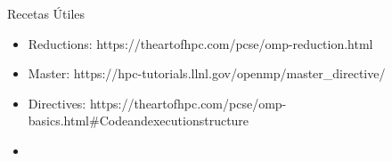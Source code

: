 \documentclass{beamer}
\begin{document}
\begin{frame}[containsverbatim]{Recetas Útiles}
    \begin{itemize}
        \item Reductions: https://theartofhpc.com/pcse/omp-reduction.html
        \item Master: https://hpc-tutorials.llnl.gov/openmp/master\_directive/
        \item Directives: https://theartofhpc.com/pcse/omp-basics.html\#Codeandexecutionstructure
        \item 
    \end{itemize}
\end{frame}
\end{document}
